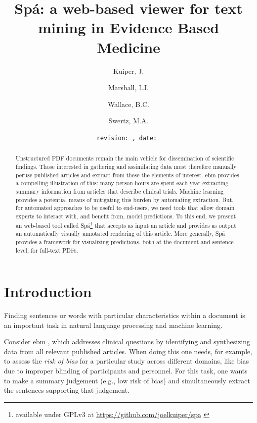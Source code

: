 \documentclass[runningheads,a4paper]{llncs}
\institute{
  University of Groningen P.O. Box 30001, 9700 RB Groningen \\ \mailsa
  \and King's College London, London SE1 3QD, UK \\ \mailsb
  \and Brown University, Providence, RI 02906, USA \\ \mailsc}
\begin{document}
\setcounter{tocdepth}{3}
\newcommand{\highlight}[1]{\colorbox{yellow}{#1}}


\author{Kuiper, J. \and Marshall, I.J. \and Wallace, B.C. \and Swertz, M.A.}
\date{\texttt{revision: \revision, date: \revisiondate}}
\title{Spá: a web-based viewer for text mining in Evidence Based Medicine}


\maketitle
\begin{abstract}
Unstructured PDF documents remain the main vehicle for dissemination of scientific findings.
Those interested in gathering and assimilating data must therefore manually peruse published articles and extract from these the elements of interest.
\acl{ebm} provides a compelling illustration of this: many person-hours are spent each year extracting summary information from articles that describe clinical trials.
Machine learning provides a potential means of mitigating this burden by automating extraction.
But, for automated approaches to be useful to end-users, we need tools that allow domain experts to interact with, and benefit from, model predictions.
To this end, we present an web-based tool called Spá\footnote{available under GPLv3 at \url{https://github.com/joelkuiper/spa} \cite{kuiper2014}} that accepts as input an article and provides as output an automatically visually annotated rendering of this article.
More generally, Spá provides a framework for visualizing predictions, both at the document and sentence level, for full-text PDFs.
\end{abstract}

\acresetall

\section{Introduction}
\label{section:intro}
Finding sentences or words with particular characteristics within a document is an important task in natural language processing and machine learning.

Consider \ac{ebm} \cite{sackett1996}, which addresses clinical questions by identifying and synthesizing data from all relevant published articles.
When doing this one needs, for example, to assess the \emph{risk of bias} for a particular study across different domains, like bias due to improper blinding of participants and personnel.
For this task, one wants to make a summary judgement (e.g., low risk of bias) and simultaneously extract the sentences supporting that judgement.
\end{document}
